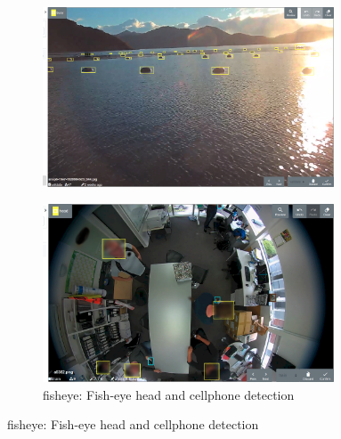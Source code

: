 \begin{figure}[h!]
\centering

\begin{subfigure}[t]{0.5\textwidth}
  \includegraphics[width=0.95\textwidth]{figures/annotation/screenshots/buoys.png}
  \caption{}
\end{subfigure}%
\begin{subfigure}[t]{0.5\textwidth}
  \includegraphics[width=0.95\textwidth]{figures/annotation/screenshots/victor.png}
  \caption{fisheye: Fish-eye head and cellphone detection }
\end{subfigure}


\end{figure}

